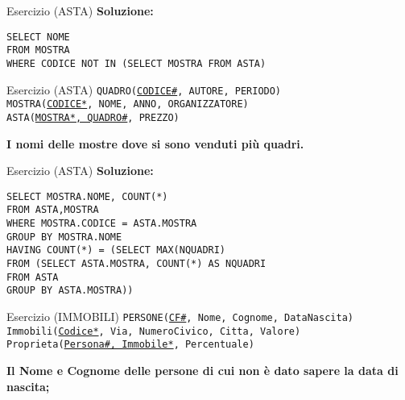 \begin{frame}{Esercizio (ASTA)}
    \textbf{Soluzione:}
    \vspace{1em}
    
    \texttt{SELECT NOME \\FROM MOSTRA \\WHERE CODICE NOT IN (SELECT MOSTRA FROM ASTA)}
    \end{frame}
\begin{frame}{Esercizio (ASTA) } 
    \texttt{QUADRO(\underline{CODICE\#}, AUTORE, PERIODO)\\
    MOSTRA(\underline{CODICE*}, NOME, ANNO, ORGANIZZATORE)\\
    ASTA(\underline{MOSTRA*, QUADRO\#}, PREZZO)}
    \vspace{1em}
    
    \textbf{I nomi delle mostre dove si sono venduti pi\`u quadri.}
\end{frame}

\begin{frame}{Esercizio (ASTA)}
    \textbf{Soluzione:}
    \vspace{1em}
    
    \texttt{SELECT MOSTRA.NOME, COUNT(*) \\FROM ASTA,MOSTRA\\WHERE MOSTRA.CODICE = ASTA.MOSTRA\\GROUP BY MOSTRA.NOME\\HAVING COUNT(*) = (SELECT MAX(NQUADRI)\\\hspace{9,5em}FROM
(SELECT ASTA.MOSTRA, COUNT(*) AS NQUADRI \\\hspace{12,5em}FROM ASTA \\\hspace{12,5em}GROUP BY ASTA.MOSTRA))}
    \end{frame}
\begin{frame}{Esercizio (IMMOBILI) } 
    \texttt{PERSONE(\underline{CF\#}, Nome, Cognome, DataNascita)\\
    Immobili(\underline{Codice*}, Via, NumeroCivico, Citta, Valore)\\
    Proprieta(\underline{Persona\#, Immobile*}, Percentuale)}
    \vspace{1em}
    
    \textbf{Il Nome e Cognome delle persone di cui non \`e dato sapere la data di nascita;}
\end{frame}


